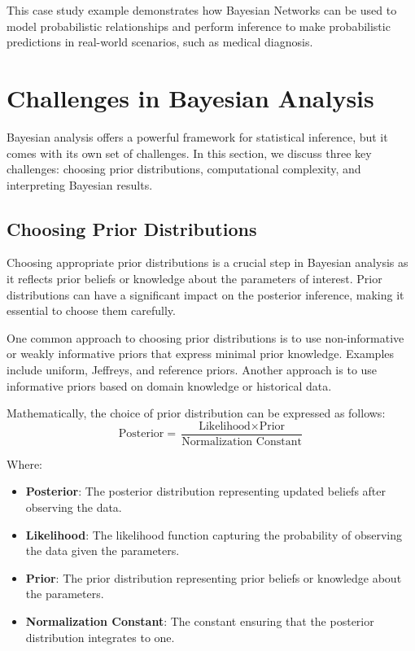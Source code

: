 \documentclass[12pt]{book} %
\begin{document}
This case study example demonstrates how Bayesian Networks can be used to model probabilistic relationships and perform inference to make probabilistic predictions in real-world scenarios, such as medical diagnosis.

\section{Challenges in Bayesian Analysis}

Bayesian analysis offers a powerful framework for statistical inference, but it comes with its own set of challenges. In this section, we discuss three key challenges: choosing prior distributions, computational complexity, and interpreting Bayesian results.

\subsection{Choosing Prior Distributions}

Choosing appropriate prior distributions is a crucial step in Bayesian analysis as it reflects prior beliefs or knowledge about the parameters of interest. Prior distributions can have a significant impact on the posterior inference, making it essential to choose them carefully.

One common approach to choosing prior distributions is to use non-informative or weakly informative priors that express minimal prior knowledge. Examples include uniform, Jeffreys, and reference priors. Another approach is to use informative priors based on domain knowledge or historical data.

Mathematically, the choice of prior distribution can be expressed as follows:
\[
\text{{Posterior}} = \frac{{\text{{Likelihood}} \times \text{{Prior}}}}{{\text{{Normalization Constant}}}}
\]

Where:
\begin{itemize}
    \item \textbf{Posterior}: The posterior distribution representing updated beliefs after observing the data.
    \item \textbf{Likelihood}: The likelihood function capturing the probability of observing the data given the parameters.
    \item \textbf{Prior}: The prior distribution representing prior beliefs or knowledge about the parameters.
    \item \textbf{Normalization Constant}: The constant ensuring that the posterior distribution integrates to one.
\end{itemize}
\end{document}
